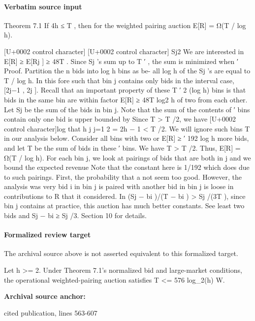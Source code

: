 \documentclass[10pt]{article}
\begin{document}
\paragraph{Verbatim source input}
\begin{ReviewVerbatim}
Theorem 7.1 If 4h ≤ T , then for the weighted pairing auction E[R] = Ω(T / log h).

[U+0002 control character]
[U+0002 control character] Sj2
We are interested in E[R] ≥
E[Rj ] ≥
48T .
Since Sj ’s sum up to T ′ , the sum is minimized when
′
Proof. Partition the n bids into log h bins as be- all log h of the Sj ’s are equal to T / log h. In this
fore such that bin j contains only bids in the interval case,
[2j−1 , 2j ]. Recall that an important property of these
T ′ 2 (log h)
bins is that bids in the same bin are within factor
E[R] ≥
48T log2 h
of two from each other. Let Sj be the sum of the
bids in bin j. Note that the sum of the contents of
′
bins
contain only one bid is upper bounded by Since T > T /2, we have
[U+0002 control character]log that
h j
j=1 2 = 2h − 1 < T /2. We will ignore such bins
T
in our analysis below. Consider all bins with two or
E[R] ≥
′
192
log h
more bids, and let T be the sum of bids in these
′
bins. We have T > T /2.
Thus, E[R] = Ω(T / log h).
For each bin j, we look at pairings of bids that
are both in j and we bound the expected revenue
Note that the constant here is 1/192 which does
due to such pairings. First, the probability that a
not seem too good. However, the analysis was very
bid i in bin j is paired with another bid in bin j is
loose in contributions to R that it considered. In
(Sj − bi )/(T − bi ) > Sj /(3T ), since bin j contains at
practice, this auction has much better constants. See
least two bids and Sj − bi ≥ Sj /3.
Section 10 for details.
\end{ReviewVerbatim}


\paragraph{Formalized review target}
The archival source above is not asserted equivalent to this formalized target.
\begin{ReviewVerbatim}
Let h >= 2. Under Theorem 7.1's normalized bid and large-market conditions, the operational weighted-pairing auction satisfies T <= 576 log_2(h) W.
\end{ReviewVerbatim}

\textbf{Archival source anchor:} {\footnotesize\raggedright cited publication, lines 563-\allowbreak{}607\par}
\end{document}
